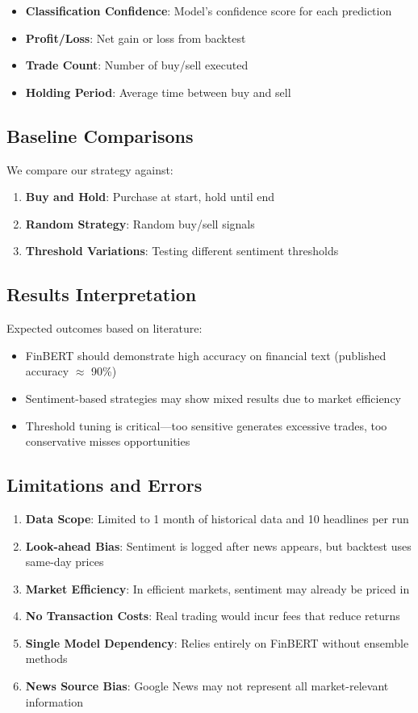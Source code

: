\documentclass[12pt]{article}
\begin{document}
\begin{itemize}
\item \textbf{Classification Confidence}: Model's confidence score for each prediction
\item \textbf{Profit/Loss}: Net gain or loss from backtest
\item \textbf{Trade Count}: Number of buy/sell executed
\item \textbf{Holding Period}: Average time between buy and sell
\end{itemize}

\subsection{Baseline Comparisons}

We compare our strategy against:
\begin{enumerate}
\item \textbf{Buy and Hold}: Purchase at start, hold until end
\item \textbf{Random Strategy}: Random buy/sell signals
\item \textbf{Threshold Variations}: Testing different sentiment thresholds
\end{enumerate}

\subsection{Results Interpretation}

Expected outcomes based on literature:
\begin{itemize}
\item FinBERT should demonstrate high accuracy on financial text (published accuracy $\approx$ 90\%)
\item Sentiment-based strategies may show mixed results due to market efficiency
\item Threshold tuning is critical—too sensitive generates excessive trades, too conservative misses opportunities
\end{itemize}

\subsection{Limitations and Errors}

\begin{enumerate}
\item \textbf{Data Scope}: Limited to 1 month of historical data and 10 headlines per run
\item \textbf{Look-ahead Bias}: Sentiment is logged after news appears, but backtest uses same-day prices
\item \textbf{Market Efficiency}: In efficient markets, sentiment may already be priced in
\item \textbf{No Transaction Costs}: Real trading would incur fees that reduce returns
\item \textbf{Single Model Dependency}: Relies entirely on FinBERT without ensemble methods
\item \textbf{News Source Bias}: Google News may not represent all market-relevant information
\end{enumerate}
\end{document}
